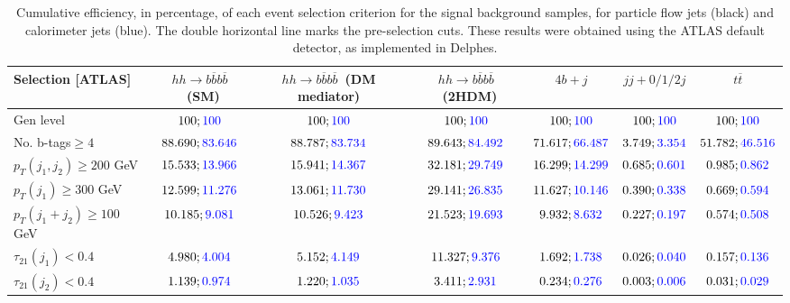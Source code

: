 \begin{landscape}
	\begin{table}
		\centering
		\caption{Cumulative efficiency, in percentage, of each event selection criterion for the signal background samples, for particle flow jets (black) and calorimeter jets (blue). The double horizontal line marks the pre-selection cuts. These results were obtained using the ATLAS default detector, as implemented in Delphes.}
		\begin{tabular}{lcccccc}
			\toprule 
			\textbf{Selection [ATLAS]} & $hh\rightarrow b\overline{b}b\overline{b}$~(SM) & $hh\rightarrow b\overline{b}b\overline{b}$~(DM mediator) & $hh\rightarrow b\overline{b}b\overline{b}$~(2HDM) & $4b+j$  & $jj+0/1/2 j$ & $t\overline{t}$ \\
			\midrule
			Gen level & $100;\textcolor{blue}{100}$ & $100;\textcolor{blue}{100}$ &$100;\textcolor{blue}{100}$& $100;\textcolor{blue}{100}$& $100;\textcolor{blue}{100}$& $100;\textcolor{blue}{100}$ \\
			\rowcolor{black!7}No. b-tags$\geq 4$&$88.690;\textcolor{blue}{83.646}$&$88.787;\textcolor{blue}{83.734}$&$89.643;\textcolor{blue}{84.492}$&$71.617;\textcolor{blue}{66.487}$&$3.749;\textcolor{blue}{3.354}$&$51.782;\textcolor{blue}{46.516}$\\
			$p_T(j_1,j_2)\geq200$ GeV & $15.533;\textcolor{blue}{13.966}$ & $15.941;\textcolor{blue}{14.367}$&$32.181;\textcolor{blue}{29.749}$ &$16.299;\textcolor{blue}{14.299}$&$0.685;\textcolor{blue}{0.601}$&$0.985;\textcolor{blue}{0.862}$\\ 
			\midrule \midrule
			\rowcolor{black!7}$p_T(j_1)\geq 300$ GeV & $12.599;\textcolor{blue}{11.276}$ &$13.061;\textcolor{blue}{11.730}$  &$29.141;\textcolor{blue}{26.835}$&$11.627;\textcolor{blue}{10.146}$&$0.390;\textcolor{blue}{0.338}$&$0.669;\textcolor{blue}{0.594}$\\ 
			$p_T(j_1+j_2)\geq 100$ GeV &$10.185;\textcolor{blue}{9.081}$ & $10.526;\textcolor{blue}{9.423}$ &$21.523;\textcolor{blue}{19.693}$&$9.932;\textcolor{blue}{8.632}$&$0.227;\textcolor{blue}{0.197}$&$0.574;\textcolor{blue}{0.508}$\\
			\rowcolor{black!7}$\tau_{21}(j_1)<0.4$ & $4.980;\textcolor{blue}{4.004}$& $5.152;\textcolor{blue}{4.149}$&$11.327;\textcolor{blue}{9.376}$&$1.692;\textcolor{blue}{1.738}$&$0.026;\textcolor{blue}{0.040}$&$0.157;\textcolor{blue}{0.136}$\\
			$\tau_{21}(j_2)<0.4$ &$1.139;\textcolor{blue}{0.974}$ &$1.220;\textcolor{blue}{1.035}$ &$3.411;\textcolor{blue}{2.931}$&$0.234;\textcolor{blue}{0.276}$&$0.003;\textcolor{blue}{0.006}$&$0.031;\textcolor{blue}{0.029}$\\

\end{tabular}
\end{table}
\end{landscape}
